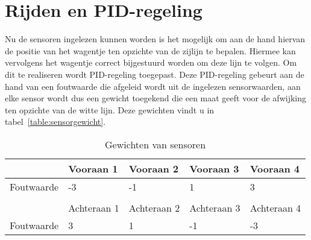 \section{Rijden en PID-regeling}
Nu de sensoren ingelezen kunnen worden is het mogelijk om aan de hand hiervan de positie van het wagentje ten opzichte van de zijlijn te bepalen.
Hiermee kan vervolgens het wagentje correct bijgestuurd worden om deze lijn te volgen. Om dit te realiseren wordt PID-regeling toegepast.
Deze PID-regeling gebeurt aan de hand van een foutwaarde die afgeleid wordt uit de ingelezen sensorwaarden, aan elke sensor wordt dus een gewicht toegekend die een maat geeft voor de afwijking ten opzichte van de witte lijn. Deze gewichten vindt u in tabel~\vref{table:sensorgewicht}.

\begin{table}[H]
	\centering
	\begin{tabular}{lllll}
		\hline
		\multicolumn{1}{|l|}{}           & \multicolumn{1}{l|}{Vooraan 1}   & \multicolumn{1}{l|}{Vooraan 2}   & \multicolumn{1}{l|}{Vooraan 3}   & \multicolumn{1}{l|}{Vooraan 4}   \\ \hline
		\multicolumn{1}{|l|}{Foutwaarde} & \multicolumn{1}{l|}{-3}          & \multicolumn{1}{l|}{-1}          & \multicolumn{1}{l|}{1}           & \multicolumn{1}{l|}{3}           \\ \hline
		&                                  &                                  &                                  &                                  \\ \hline
		\multicolumn{1}{|l|}{}           & \multicolumn{1}{l|}{Achteraan 1} & \multicolumn{1}{l|}{Achteraan 2} & \multicolumn{1}{l|}{Achteraan 3} & \multicolumn{1}{l|}{Achteraan 4} \\ \hline
		\multicolumn{1}{|l|}{Foutwaarde} & \multicolumn{1}{l|}{3}           & \multicolumn{1}{l|}{1}           & \multicolumn{1}{l|}{-1}          & \multicolumn{1}{l|}{-3}           \\ \hline
	\end{tabular}
	\caption{Gewichten van sensoren}
	\label{table:sensorgewicht}
\end{table}

